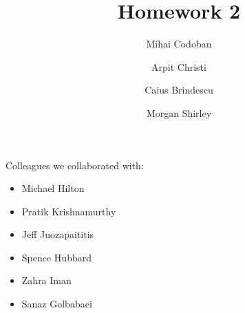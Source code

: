 \documentclass{article}
\title{Homework 2}
\author{Mihai Codoban \and Arpit Christi \and Caius Brindescu \and Morgan Shirley}
\begin{document}
\maketitle

Colleagues we collaborated with:
\begin{itemize}
	\item Michael Hilton
	\item Pratik Krishnamurthy
	\item Jeff Juozapaititis 
	\item Spence Hubbard
	\item Zahra Iman
	\item Sanaz Golbabaei
\end{itemize}






\end{document}
